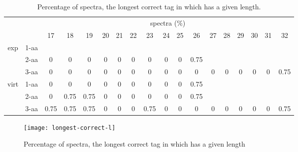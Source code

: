 \documentclass{article}[12pt]
\begin{document}
\begin{landscape}
\begin{table}[h]\tiny
\vspace{3mm}
{\centering
\begin{center}
\begin{tabular}{|c|l|c|c|c|c|c|c|c|c|c|c|c|c|c|c|c|c|}
  \hline
  \multicolumn{2}{|c|}{ } & \multicolumn{ 16 }{|c|}{ spectra (\%)} \\
  \cline{3- 18}
  \multicolumn{2}{|c|}{ }  & 17 & 18 & 19 & 20 & 21 & 22 & 23 & 24 & 25 & 26 & 27 & 28 & 29 & 30 & 31 & 32\\
  \hline
  \multirow{3}{*}{exp}
&  1-aa  &  &  &  &  &  &  &  &  &  &  &  &  &  &  &  & \\
&  2-aa  & 0 & 0 & 0 & 0 & 0 & 0 & 0 & 0 & 0 & 0.75 &  &  &  &  &  & \\
&  3-aa  & 0 & 0 & 0 & 0 & 0 & 0 & 0 & 0 & 0 & 0 & 0 & 0 & 0 & 0 & 0 & 0.75\\
 \hline
  \multirow{3}{*}{virt} 
&  1-aa  & 0 & 0 & 0 & 0 & 0 & 0 & 0 & 0 & 0 & 0.75 &  &  &  &  &  & \\
&  2-aa  & 0 & 0.75 & 0.75 & 0 & 0 & 0 & 0 & 0 & 0 & 0.75 &  &  &  &  &  & \\
&  3-aa  & 0.75 & 0.75 & 0.75 & 0 & 0 & 0 & 0.75 & 0 & 0 & 0 & 0 & 0 & 0 & 0 & 0 & 0.75\\
 \hline
\end{tabular}
\end{center}
\par}
\centering
\caption{ Percentage of spectra, the longest correct tag in which has a given length.}
\label{table:longest-correct-l}
\vspace{3mm}
\end{table}

\end{landscape}

\begin{figure}
  \begin{center}
\texttt{[image: longest-correct-l]}
\end{center}
\caption{Percentage of spectra, the longest correct tag in which has a given length}
  \label{fig:longest-correct-l}
\end{figure}
\end{document}
